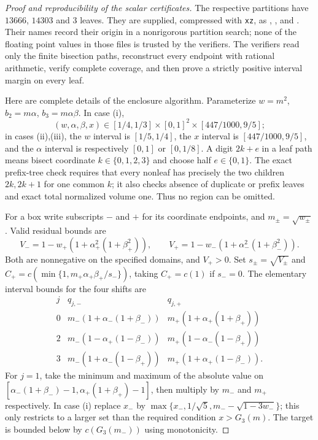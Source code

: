 \documentclass[11pt]{article}
\theoremstyle{remark}\newtheorem{remark}[theorem]{Remark}
\begin{document}
\begin{proof}[Proof and reproducibility of the scalar certificates]
The respective partitions have $13666$, $14303$ and $3$ leaves.
They are supplied, compressed with \texttt{xz}, as
,
, and
.
Their names record their origin in a nonrigorous partition search;
none of the floating point values in those files is trusted by the
verifiers. The verifiers read only the finite bisection paths, reconstruct
every endpoint with rational arithmetic, verify complete coverage, and
then prove a strictly positive interval margin on every leaf.

Here are complete details of the enclosure algorithm.
Parameterize $w=m^2$, $b_2=m\alpha$, $b_3=m\alpha\beta$.
In case (i),
\[
 (w,\alpha,\beta,x)\in[1/4,1/3]\times[0,1]^2
 \times[447/1000,9/5];
\]
in cases (ii),(iii), the $w$ interval is $[1/5,1/4]$, the $x$
interval is $[447/1000,9/5]$, and the $\alpha$ interval is respectively
$[0,1]$ or $[0,1/8]$. A digit $2k+e$ in a leaf path means bisect
coordinate $k\in\{0,1,2,3\}$ and choose half $e\in\{0,1\}$.
The exact prefix-tree check requires that every nonleaf has precisely
the two children $2k,2k+1$ for one common $k$; it also checks absence
of duplicate or prefix leaves and exact total normalized volume one.
Thus no region can be omitted.

For a box write subscripts $-$ and $+$ for its coordinate endpoints,
and $m_\pm=\sqrt{w_\pm}$. Valid residual bounds are
\[
 V_-=1-w_+(1+\alpha_+^2(1+\beta_+^2)),\qquad
 V_+=1-w_-(1+\alpha_-^2(1+\beta_-^2)).
\]
Both are nonnegative on the specified domains, and $V_+>0$.
Set $s_\pm=\sqrt{V_\pm}$ and
$C_+=c(\min\{1,m_+\alpha_+\beta_+/s_-\})$, taking $C_+=c(1)$
if $s_-=0$. The elementary interval bounds for the four shifts are
\[
\begin{array}{c|cc}
j&q_{j,-}&q_{j,+}\\\hline
0&m_-(1+\alpha_-(1+\beta_-))&m_+(1+\alpha_+(1+\beta_+))\\
2&m_-(1-\alpha_+(1-\beta_-))&m_+(1-\alpha_-(1-\beta_+))\\
3&m_-(1+\alpha_-(1-\beta_+))&m_+(1+\alpha_+(1-\beta_-)).
\end{array}
\]
For $j=1$, take the minimum and maximum of the absolute value on
$[\alpha_-(1+\beta_-)-1,\alpha_+(1+\beta_+)-1]$, then multiply
by $m_-$ and $m_+$ respectively. In case (i) replace $x_-$ by
$\max\{x_-,1/\sqrt5,m_- -\sqrt{1-3w_-}\}$; this only restricts
to a larger set than the required condition $x>G_3(m)$.
The target is bounded below by $c(G_3(m_-))$ using monotonicity.


\end{proof}
\end{document}
